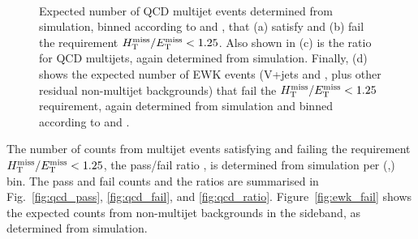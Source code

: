 \begin{figure}[!h]
{   %
  } \\
  \caption{Expected number of QCD multijet events determined from
    simulation, binned according to \njet and \scalht, that (a) satisfy
    and (b) fail the requirement $\mbox{$\mbox{$H_{\rm T}^{\rm miss}$} / \mbox{$E_\text{T}^{\rm miss}$}$} < 1.25$. Also shown in (c)
    is the ratio \rmhtmet for QCD multijets, again determined from
    simulation. Finally, (d) shows the expected number of EWK events
    (V+jets and \ttbar, plus other residual non-multijet backgrounds)
    that fail the $\mbox{$\mbox{$H_{\rm T}^{\rm miss}$} / \mbox{$E_\text{T}^{\rm miss}$}$} < 1.25$ requirement, again determined from
    simulation and binned according to \njet and \scalht.}
  \label{fig:qcd_plots}
\end{figure}

The number of counts from multijet events satisfying and failing the
requirement $\mbox{$\mbox{$H_{\rm T}^{\rm miss}$} / \mbox{$E_\text{T}^{\rm miss}$}$} < 1.25$, \ie the pass/fail ratio \rmhtmet, is
determined from simulation per (\njet,\scalht) bin. The pass and fail
counts and the ratios are summarised in Fig.~\ref{fig:qcd_pass},
\ref{fig:qcd_fail}, and \ref{fig:qcd_ratio}. Figure~\ref{fig:ewk_fail}
shows the expected counts from non-multijet backgrounds in the \mhtmet
sideband, as determined from simulation.

